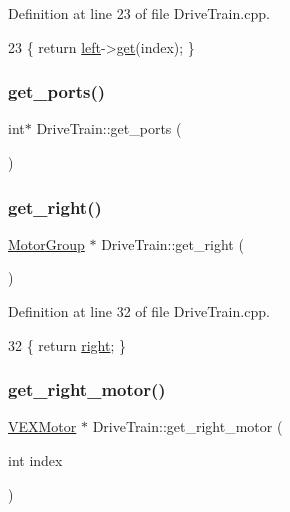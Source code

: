 Definition at line 23 of file Drive\+Train.\+cpp.


\begin{DoxyCode}
23 \{ \textcolor{keywordflow}{return} \hyperlink{class_drive_train_a8343c1e4fad9e5c7e68e627f592e52ea}{left}->\hyperlink{class_motor_group_a5bb7e87231ada3770df40783a2c6afda}{get}(index); \}
\end{DoxyCode}
\mbox{\label{class_drive_train_a79742e748af105aa28332142fdc529f7}} 
\subsubsection{\texorpdfstring{get\+\_\+ports()}{get\_ports()}}
{\footnotesize\ttfamily int$\ast$ Drive\+Train\+::get\+\_\+ports (\begin{DoxyParamCaption}{ }\end{DoxyParamCaption})}

\mbox{\label{class_drive_train_ae07aafb05b73ef4db6952c16f58436ea}} 
\subsubsection{\texorpdfstring{get\+\_\+right()}{get\_right()}}
{\footnotesize\ttfamily \hyperlink{class_motor_group}{Motor\+Group} $\ast$ Drive\+Train\+::get\+\_\+right (\begin{DoxyParamCaption}{ }\end{DoxyParamCaption})}



Definition at line 32 of file Drive\+Train.\+cpp.


\begin{DoxyCode}
32 \{ \textcolor{keywordflow}{return} \hyperlink{class_drive_train_a1fe3a54242798b1b88eb437c7c7cf9ad}{right}; \}
\end{DoxyCode}
\mbox{\label{class_drive_train_a8e2201be0bd64a6ad6215ceed213bcbc}} 
\subsubsection{\texorpdfstring{get\+\_\+right\+\_\+motor()}{get\_right\_motor()}}
{\footnotesize\ttfamily \hyperlink{class_v_e_x_motor}{V\+E\+X\+Motor} $\ast$ Drive\+Train\+::get\+\_\+right\+\_\+motor (\begin{DoxyParamCaption}\item[{int}]{index }\end{DoxyParamCaption})}



